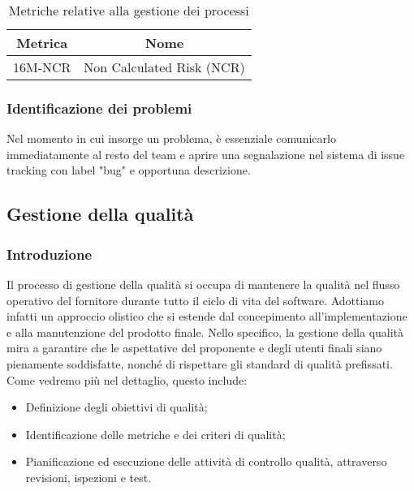 \begin{table}[h]
	\caption{Metriche relative alla gestione dei processi}
	\centering
	\begin{tabular}{|c|c|}
		\hline
		\textbf{Metrica} & \textbf{Nome}             \\
		\hline
		16M-NCR          & Non Calculated Risk (NCR) \\
		\hline
	\end{tabular}
\end{table}

\subsubsection{Identificazione dei problemi}
Nel momento in cui insorge un problema, è essenziale comunicarlo immediatamente al resto del team e aprire una segnalazione nel sistema di
issue tracking con label "bug" e opportuna descrizione.

\subsection{Gestione della qualità}
\subsubsection{Introduzione}
Il processo di gestione della qualità si occupa di mantenere la qualità nel flusso operativo del fornitore
durante tutto il ciclo di vita del software. Adottiamo infatti un approccio
olistico che si estende dal concepimento all'implementazione e alla manutenzione del prodotto finale.
Nello specifico, la gestione della qualità mira a garantire che le aspettative del proponente e
degli utenti finali siano pienamente soddisfatte, nonché di rispettare gli standard di qualità prefissati. Come vedremo più nel dettaglio,
questo include:
\begin{itemize}
	\item Definizione degli obiettivi di qualità;
	\item Identificazione delle metriche e dei criteri di qualità;
	\item Pianificazione ed esecuzione delle attività di controllo qualità, attraverso revisioni, ispezioni e test.
\end{itemize}

